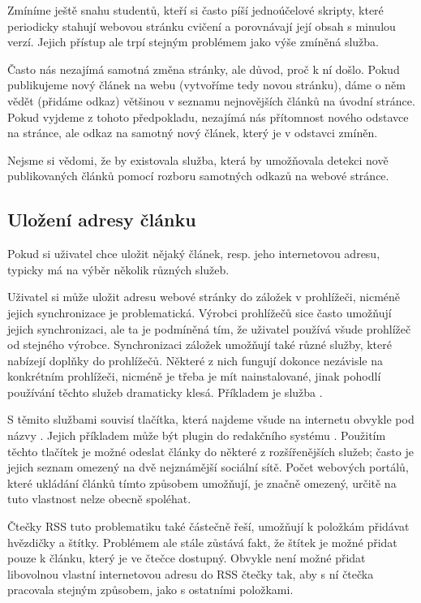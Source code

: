 Zmíníme ještě snahu studentů, kteří si často píší jednoúčelové skripty, které periodicky stahují webovou stránku cvičení a porovnávají její obsah s minulou verzí.
Jejich přístup ale trpí stejným problémem jako výše zmíněná služba.

Často nás nezajímá samotná změna stránky, ale důvod, proč k ní došlo.
Pokud publikujeme nový článek na webu (vytvoříme tedy novou stránku), dáme o něm vědět (přidáme odkaz) většinou v seznamu nejnovějších článků na úvodní stránce.
Pokud vyjdeme z tohoto předpokladu, nezajímá nás přítomnost nového odstavce na stránce, ale odkaz na samotný nový článek, který je v odstavci zmíněn.

Nejsme si vědomi, že by existovala služba, která by umožňovala detekci nově publikovaných článků pomocí rozboru samotných odkazů na webové stránce.

\subsection{Uložení adresy článku}

Pokud si uživatel chce uložit nějaký článek, resp. jeho internetovou adresu, typicky má na výběr několik různých služeb.

Uživatel si může uložit adresu webové stránky do záložek v prohlížeči, nicméně jejich synchronizace je problematická.
Výrobci prohlížečů sice často umožňují jejich synchronizaci, ale ta je podmíněná tím, že uživatel používá všude prohlížeč od stejného výrobce.
Synchronizaci záložek umožňují také různé služby, které nabízejí doplňky do prohlížečů.
Některé z nich fungují dokonce nezávisle na konkrétním prohlížeči, nicméně je třeba je mít nainstalované, jinak pohodlí používání těchto služeb dramaticky klesá.
Příkladem je služba .

S těmito službami souvisí tlačítka, která najdeme všude na internetu obvykle pod názvy .
Jejich příkladem může být plugin  do redakčního systému .
Použitím těchto tlačítek je možné odeslat články do některé z rozšířenějších služeb; často je jejich seznam omezený na dvě nejznámější sociální sítě.
Počet webových portálů, které ukládání článků tímto způsobem umožňují, je značně omezený, určitě na tuto vlastnost nelze obecně spoléhat.

Čtečky RSS tuto problematiku také částečně řeší, umožňují k položkám přidávat hvězdičky a štítky.
Problémem ale stále zůstává fakt, že štítek je možné přidat pouze k článku, který je ve čtečce dostupný.
Obvykle není možné přidat libovolnou vlastní internetovou adresu do RSS čtečky tak, aby s ní čtečka pracovala stejným způsobem, jako s ostatními položkami.

